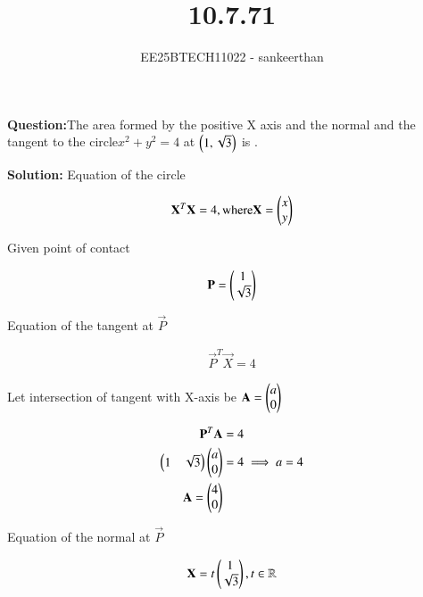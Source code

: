\documentclass[journal]{IEEEtran}
\begin{document}


\title{10.7.71}
\author{EE25BTECH11022 - sankeerthan}
{\let\newpage\relax\maketitle}

\renewcommand{\thefigure}{\theenumi}
\renewcommand{\thetable}{\theenumi}
\setlength{\intextsep}{10pt} %


\renewcommand{\thetable}{\theenumi}

\textbf{Question:}The area formed by the positive X axis and the normal and the tangent to the circle$x^2 + y^2 = 4$ at $\left(1,\sqrt{3}\right)$ is \underline{\phantom{imagine}}. 


\textbf{Solution:}
Equation of the circle

\begin{align}
\mathbf{X}^T \mathbf{X} = 4 ,\text{where} \mathbf{X} =\begin{pmatrix}x \\ y\end{pmatrix}
\end{align}

Given point of contact

\begin{align}
\mathbf{P} = \begin{pmatrix}1 \\ \sqrt{3}\end{pmatrix}
\end{align}

Equation of the tangent at $\vec{P}$

\begin{align}
\vec{P}^T \vec{X} = 4
\end{align}

Let intersection of tangent with X-axis be $\mathbf{A} =\begin{pmatrix}a \\ 0\end{pmatrix}$

\begin{align}
\mathbf{P}^T \mathbf{A} &= 4  \\
\begin{pmatrix}1 & \sqrt{3}\end{pmatrix}\begin{pmatrix}a \\ 0\end{pmatrix} &= 4 \implies a = 4 \\
\mathbf{A} = \begin{pmatrix}4 \\ 0\end{pmatrix}
\end{align}

Equation of the normal at $\vec{P}$

\begin{align}
\mathbf{X} = t\begin{pmatrix}1 \\ \sqrt{3}\end{pmatrix},t \in \mathbb{R}
\end{align}
\end{document}

